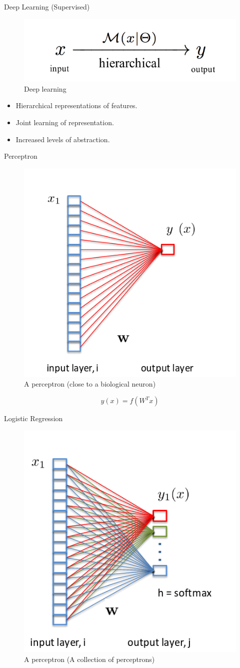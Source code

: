 ﻿\documentclass[aspectratio=43,mathserif,xcolor={usenames,dvipsnames,svgnames,table},10pt]{beamer}
\begin{document}
\begin{frame}{Deep Learning (Supervised)}
 \begin{figure}[h]
    \includegraphics[width=0.9\linewidth]{images/dl.png}  
    \caption{Deep learning}
  \end{figure}
 \begin{itemize}
  \item<+-> Hierarchical representations of features.
  \item<+-> Joint learning of representation.
  \item<+-> Increased levels of abstraction.
 \end{itemize}
\end{frame}

\begin{frame}{Perceptron}
 \begin{figure}[h]
    \includegraphics[width=0.5\linewidth]{images/perceptron.png}  
    \caption{A perceptron (close to a biological neuron)}
  \end{figure}
  $$ y(x) = f( W^T x )$$
\end{frame}

\begin{frame}{Logistic Regression}
 \begin{figure}[h]
    \includegraphics[width=0.5\linewidth]{images/lr.png}  
    \caption{A perceptron (A collection of perceptrons)}
  \end{figure}
\end{frame}
\end{document}
